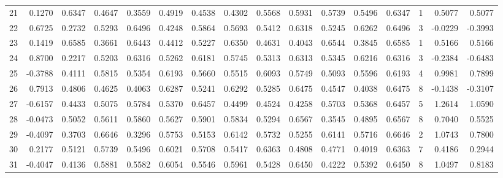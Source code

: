 \begin{tabular}{lrrrrrrrrrrrrrrr}
21  &      0.1270 &  0.6347 &  0.4647 &  0.3559 &  0.4919 &  0.4538 &  0.4302 &  0.5568 &  0.5931 &  0.5739 &   0.5496 &     0.6347 &      1 &                    0.5077 &                     0.5077 \\
22  &      0.6725 &  0.2732 &  0.5293 &  0.6496 &  0.4248 &  0.5864 &  0.5693 &  0.5412 &  0.6318 &  0.5245 &   0.6262 &     0.6496 &      3 &                   -0.0229 &                    -0.3993 \\
23  &      0.1419 &  0.6585 &  0.3661 &  0.6443 &  0.4412 &  0.5227 &  0.6350 &  0.4631 &  0.4043 &  0.6544 &   0.3845 &     0.6585 &      1 &                    0.5166 &                     0.5166 \\
24  &      0.8700 &  0.2217 &  0.5203 &  0.6316 &  0.5262 &  0.6181 &  0.5745 &  0.5313 &  0.6313 &  0.5345 &   0.6216 &     0.6316 &      3 &                   -0.2384 &                    -0.6483 \\
25  &     -0.3788 &  0.4111 &  0.5815 &  0.5354 &  0.6193 &  0.5660 &  0.5515 &  0.6093 &  0.5749 &  0.5093 &   0.5596 &     0.6193 &      4 &                    0.9981 &                     0.7899 \\
26  &      0.7913 &  0.4806 &  0.4625 &  0.4063 &  0.6287 &  0.5241 &  0.6292 &  0.5285 &  0.6475 &  0.4547 &   0.4038 &     0.6475 &      8 &                   -0.1438 &                    -0.3107 \\
27  &     -0.6157 &  0.4433 &  0.5075 &  0.5784 &  0.5370 &  0.6457 &  0.4499 &  0.4524 &  0.4258 &  0.5703 &   0.5368 &     0.6457 &      5 &                    1.2614 &                     1.0590 \\
28  &     -0.0473 &  0.5052 &  0.5611 &  0.5860 &  0.5627 &  0.5901 &  0.5834 &  0.5294 &  0.6567 &  0.3545 &   0.4895 &     0.6567 &      8 &                    0.7040 &                     0.5525 \\
29  &     -0.4097 &  0.3703 &  0.6646 &  0.3296 &  0.5753 &  0.5153 &  0.6142 &  0.5732 &  0.5255 &  0.6141 &   0.5716 &     0.6646 &      2 &                    1.0743 &                     0.7800 \\
30  &      0.2177 &  0.5121 &  0.5739 &  0.5496 &  0.6021 &  0.5708 &  0.5417 &  0.6363 &  0.4808 &  0.4771 &   0.4019 &     0.6363 &      7 &                    0.4186 &                     0.2944 \\
31  &     -0.4047 &  0.4136 &  0.5881 &  0.5582 &  0.6054 &  0.5546 &  0.5961 &  0.5428 &  0.6450 &  0.4222 &   0.5392 &     0.6450 &      8 &                    1.0497 &                     0.8183 \\

\end{tabular}
